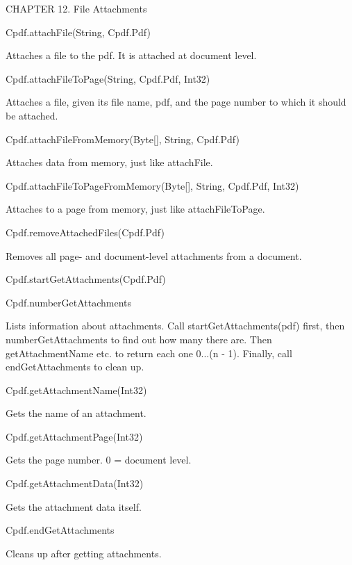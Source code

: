 CHAPTER 12. File Attachments

Cpdf.attachFile(String, Cpdf.Pdf)

Attaches a file to the pdf. It is attached at document level.

Cpdf.attachFileToPage(String, Cpdf.Pdf, Int32)

Attaches a file, given its file name, pdf, and the page number to which it
should be attached.

Cpdf.attachFileFromMemory(Byte[], String, Cpdf.Pdf)

Attaches data from memory, just like attachFile.

Cpdf.attachFileToPageFromMemory(Byte[], String, Cpdf.Pdf, Int32)

Attaches to a page from memory, just like attachFileToPage.

Cpdf.removeAttachedFiles(Cpdf.Pdf)

Removes all page- and document-level attachments from a document.

Cpdf.startGetAttachments(Cpdf.Pdf)

Cpdf.numberGetAttachments

Lists information about attachments. Call startGetAttachments(pdf) first, then
numberGetAttachments to find out how many there are. Then getAttachmentName
etc. to return each one 0...(n - 1). Finally, call endGetAttachments to clean
up.

Cpdf.getAttachmentName(Int32)

Gets the name of an attachment.

Cpdf.getAttachmentPage(Int32)

Gets the page number. 0 = document level.

Cpdf.getAttachmentData(Int32)

Gets the attachment data itself.

Cpdf.endGetAttachments

Cleans up after getting attachments.
